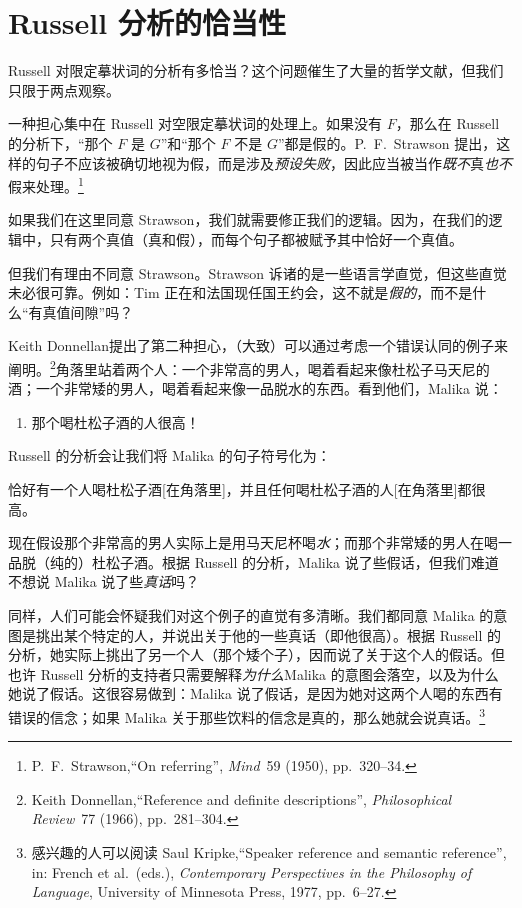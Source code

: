 \section{Russell 分析的恰当性}
Russell 对限定摹状词的分析有多恰当？这个问题催生了大量的哲学文献，但我们只限于两点观察。

一种担心集中在 Russell 对空限定摹状词的处理上。如果没有 $F$，那么在 Russell 的分析下，“那个 $F$ 是 $G$”和“那个 $F$ 不是 $G$”都是假的。P.~F.\ Strawson 提出，这样的句子不应该被确切地视为假，而是涉及\emph{预设失败}，因此应当被当作\emph{既不}真\emph{也不}假来处理。\footnote{P.~F.\ Strawson,“On referring”, \textit{Mind}~59 (1950), pp.\ 320--34.}

如果我们在这里同意 Strawson，我们就需要修正我们的逻辑。因为，在我们的逻辑中，只有两个真值（真和假），而每个句子都被赋予其中恰好一个真值。

但我们有理由不同意 Strawson。Strawson 诉诸的是一些语言学直觉，但这些直觉未必很可靠。例如：Tim 正在和法国现任国王约会，这不就是\emph{假的}，而不是什么“有真值间隙”吗？

Keith Donnellan提出了第二种担心，（大致）可以通过考虑一个错误认同的例子来阐明。\footnote{Keith Donnellan,“Reference and definite descriptions”, \textit{Philosophical Review}~77 (1966), pp.\ 281--304.}角落里站着两个人：一个非常高的男人，喝着看起来像杜松子马天尼的酒；一个非常矮的男人，喝着看起来像一品脱水的东西。看到他们，Malika 说：
	\begin{enumerate}
		\item\label{gindrinker} 那个喝杜松子酒的人很高！
	\end{enumerate}
Russell 的分析会让我们将 Malika 的句子符号化为：
	\begin{compactlist}
		\item[\ref*{gindrinker}$'$.] 恰好有一个人喝杜松子酒[在角落里]，并且任何喝杜松子酒的人[在角落里]都很高。
	\end{compactlist}
现在假设那个非常高的男人实际上是用马天尼杯喝\emph{水}；而那个非常矮的男人在喝一品脱（纯的）杜松子酒。根据 Russell 的分析，Malika 说了些假话，但我们难道不想说 Malika 说了些\emph{真话}吗？

同样，人们可能会怀疑我们对这个例子的直觉有多清晰。我们都同意 Malika 的意图是挑出某个特定的人，并说出关于他的一些真话（即他很高）。根据 Russell 的分析，她实际上挑出了另一个人（那个矮个子），因而说了关于这个人的假话。但也许 Russell 分析的支持者只需要解释\emph{为什么}Malika 的意图会落空，以及为什么她说了假话。这很容易做到：Malika 说了假话，是因为她对这两个人喝的东西有错误的信念；如果 Malika 关于那些饮料的信念是真的，那么她就会说真话。\footnote{感兴趣的人可以阅读 Saul Kripke,“Speaker reference and semantic reference”, in: French et al.\ (eds.), \textit{Contemporary Perspectives in the Philosophy of Language}, University of Minnesota Press, 1977, pp.\ 6--27.}

